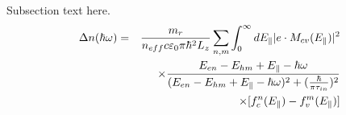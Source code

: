 Subsection text here.
\begin{eqnarray}
    \Delta n(\hbar\omega) &=& \frac{m_r}{n_{eff} c \varepsilon_0 \pi \hbar^2 L_z}
        \sum_{n,m} \int_0^\infty dE_\parallel |e\cdot M_{cv}(E_\parallel)|^2 \notag\\
    && \times \frac{E_{en}-E_{hm}+E_\parallel-\hbar\omega}
        {(E_{en}-E_{hm}+E_\parallel-\hbar\omega)^2+(\frac{\hbar}{\pi \tau_{in}})^2} \notag\\
    && \times [f_c^n(E_\parallel)-f_v^m(E_\parallel)]
\end{eqnarray}

